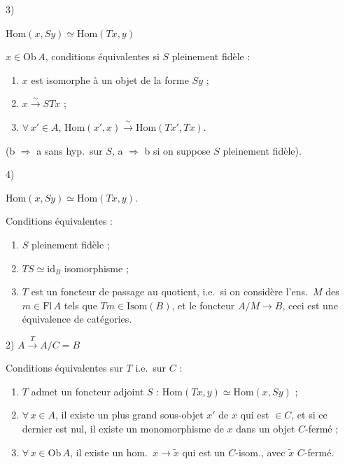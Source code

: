 \documentclass[11pt,a4paper]{article}
\begin{document}
3) \quad
{}
\quad $\mathrm{Hom}(x, Sy) \simeq \mathrm{Hom}(Tx, y)$

$x \in \mathrm{Ob}\, A$, conditions équivalentes si $S$ pleinement fidèle :
\begin{enumerate}
\item[a)] $x$ est isomorphe à un objet de la forme $Sy$ ;
\item[b)] $x \xrightarrow{\ \sim\ } STx$ ;
\item[c)] $\forall\, x' \in A$, \quad
      $\mathrm{Hom}(x', x) \xrightarrow{\ \sim\ } \mathrm{Hom}(Tx', Tx)$.
\end{enumerate}

(b $\Rightarrow$ a sans hyp.\ sur $S$, a $\Rightarrow$ b si on suppose $S$
pleinement fidèle).

4) \quad
{}
\quad $\mathrm{Hom}(x, Sy) \simeq \mathrm{Hom}(Tx, y)$.

Conditions équivalentes :
\begin{enumerate}
\item[a)] $S$ pleinement fidèle ;
\item[b)] $TS \simeq \mathrm{id}_{B}$ isomorphisme ;
\item[c)] $T$ est un foncteur de passage au quotient, i.e.\ si on considère
      l'ens.\ $M$ des $m \in \mathrm{Fl}\, A$ tels que $Tm \in \mathrm{Isom}(B)$,
      et le foncteur $A/M \to B$, ceci est une équivalence de catégories.
\end{enumerate}

2) \quad $A \xrightarrow{\ T\ } A/C = B$

Conditions équivalentes sur $T$ i.e.\ sur $C$ :
\begin{enumerate}
\item[a)] $T$ admet un foncteur adjoint $S$ :
      $\mathrm{Hom}(Tx, y) \simeq \mathrm{Hom}(x, Sy)$ ;
\item[b)] $\forall\, x \in A$, il existe un plus grand sous-objet $x'$ de $x$
      qui est $\in C$, et si ce dernier est nul, il existe un monomorphisme de
      $x$ dans un objet $C$-fermé ;
\item[c)] $\forall\, x \in \mathrm{Ob}\, A$, il existe un hom.\
      $x \to \widetilde{x}$ qui est un $C$-isom., avec $\widetilde{x}$
      $C$-fermé.
\end{enumerate}
\end{document}
